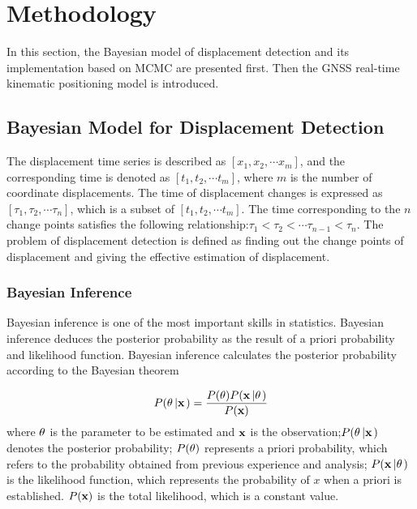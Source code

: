 \documentclass{svjour3}                     %
\begin{document}


\section{Methodology}
\label{method}
In this section, the Bayesian model of displacement detection and its implementation based on MCMC are presented first. Then the GNSS  real-time kinematic positioning model is introduced.
\subsection{Bayesian Model for Displacement Detection}


The displacement time series is described as $\left[ {{x_1},{x_2}, \cdots {x_m}} \right]$,  and the corresponding time is denoted as $\left[ {{t_1},{t_2}, \cdots {t_m}} \right]$, where $m$ is the number of coordinate displacements. The time of displacement changes is expressed as $\left[ {{\tau _1},{\tau _2}, \cdots {\tau _n}} \right]$, which is a subset of $\left[ {{t_1},{t_2}, \cdots {t_m}} \right]$.  
The time corresponding to the $n$ change points satisfies the following relationship:$ {{\tau _1}<{\tau _2}<\cdots {\tau _{n-1}}<{\tau _n}} $.
The problem of displacement detection is defined as finding out the change points of displacement and giving the effective estimation of displacement.

\subsubsection{Bayesian Inference}
Bayesian inference is one of the most important skills in statistics. Bayesian inference deduces the posterior probability as the result of a priori probability and likelihood function. Bayesian inference calculates the posterior probability according to the Bayesian theorem\citep{chen2009modulation,chen2013bayesian}

\begin{equation}\label{eq_bayesian_inference}
P({\bf{\theta }}\left| {\bf{x}} \right.) = \frac{{P({\bf{\theta }})P({\bf{x}}\left| {\bf{\theta }} \right.)}}{{P({\bf{x}})}}
\end{equation}
where $\bf{\theta }$ is the parameter to be estimated and $\bf{x}$ is the observation;$P({\bf{\theta }}\left| {\bf{x}} \right.)$ denotes the posterior probability; $P({\bf{\theta }})$ represents a priori probability, which refers to the probability obtained from previous experience and analysis;
$P({\bf{x}}\left| {\bf{\theta }} \right.)$ is the likelihood function, which represents the probability of $x$ when a priori is established. ${P({\bf{x}})}$ is the total likelihood, which is a constant value.
\end{document}

